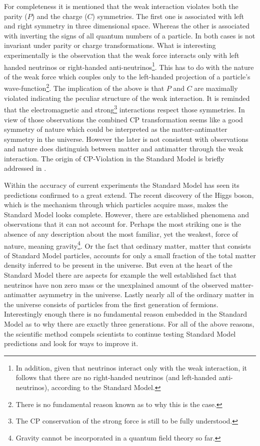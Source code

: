 For completeness it is mentioned that the weak interaction violates both the parity ($P$) and the charge ($C$) symmetries.
The first one is associated with left and right symmetry in three dimensional space. Whereas the other is associated with inverting the signs of all quantum numbers of a particle.
In both cases  is not invariant under parity or charge transformations. What is interesting experimentally
is the observation\cite{wu-parity,garwin-parity} that the weak force interacts only with left handed neutrinos or right-handed
anti-neutrinos\footnote{In addition, given that neutrinos interact only with the weak interaction, it follows that there are no
right-handed neutrinos (and left-handed anti-neutrinos), according to the Standard Model.}. This has to do with the nature of
the weak force which couples only to the left-handed projection of a particle's
wave-function\footnote{There is no fundamental reason known as to why this is the case.}. The implication of the above is that
$P$ and $C$ are maximally violated indicating the peculiar structure of the weak interaction. It is reminded that
the electromagnetic and strong\footnote{The CP conservation of the strong force is still to be fully understood.} interactions respect those symmetries. In view of those observations the combined CP transformation
seems like a good symmetry of nature which could be interpreted as the matter-antimatter symmetry in the universe\cite{Sakharov:1967dj}.
However the later is not consistent with observations and nature does distinguish between matter and antimatter through
the weak interaction. The origin of CP-Violation in the Standard Model is briefly addressed in .

Within the accuracy of current experiments the Standard Model has seen its predictions confirmed to a great extend.
The recent discovery of the Higgs boson, which is the mechanism through which particles acquire mass, makes the Standard Model looks
complete. However, there are established phenomena and observations that it can not
account for. Perhaps the most striking one is the absence of any description about the most familiar, yet the weakest, force of nature,
meaning gravity\footnote{Gravity cannot be incorporated in a quantum field theory so far.}.
Or the fact that ordinary matter, \ie matter that consists of Standard Model particles, accounts for only a small
fraction of the total matter density inferred to be present in the universe\cite{dmatter-Hinshaw}. But even at the heart
of the Standard Model there are aspects for example the well established fact that neutrinos have non zero
mass\cite{nu-mass-superkam,nu-mass-kamland,nu-mass-sno,nu-mass-daya} or the unexplained amount of the observed
matter-antimatter asymmetry in the universe\cite{more-cpv-huet,more-cpv-gavela_I,more-cpv-gavela_II}.
Lastly nearly all of the ordinary matter in the universe consists of
particles from the first generation of fermions. Interestingly enough there is no fundamental reason embedded in the Standard Model
as to why there are exactly three generations. For all of the above reasons, the scientific method compels scientists to continue
testing Standard Model predictions and look for ways to improve it.

